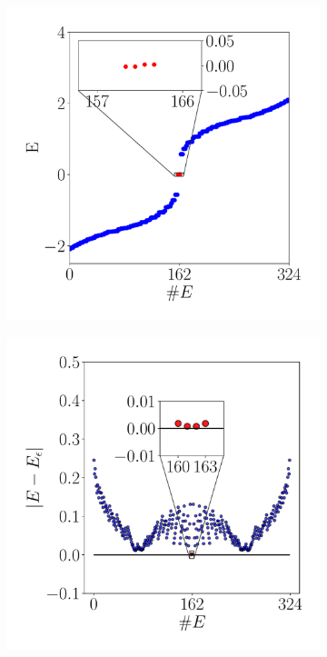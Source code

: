 


\begin{figure}[h!]
    \centering
   \captionsetup[sub]{font=small}

    \begin{subfigure}[b!]{0.5 \textwidth}
        \caption{}
        \includegraphics[width=\textwidth]{Imagenes/Resultados_Hoti_Cuadrado/spectre_square.pdf}
    \end{subfigure}
    \begin{subfigure}[b!]{0.5 \textwidth}
        \caption{}
        \includegraphics[width=\textwidth]{Imagenes/Resultados_Hoti_Cuadrado/spectre_square_epsi.pdf}

\end{subfigure}
\end{figure}
